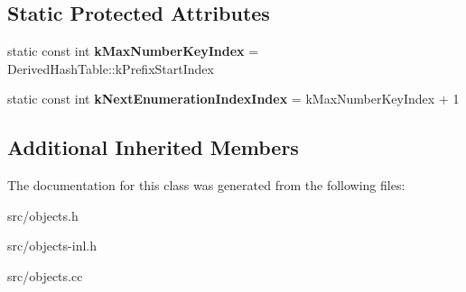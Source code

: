 \subsection*{Static Protected Attributes}
\begin{DoxyCompactItemize}
\item 
\hypertarget{classv8_1_1internal_1_1_dictionary_a7a69bd868bc49dfac48d810d96477fd0}{}static const int {\bfseries k\+Max\+Number\+Key\+Index} = Derived\+Hash\+Table\+::k\+Prefix\+Start\+Index\label{classv8_1_1internal_1_1_dictionary_a7a69bd868bc49dfac48d810d96477fd0}

\item 
\hypertarget{classv8_1_1internal_1_1_dictionary_a533fe267328e05aaa345589cc5ae69eb}{}static const int {\bfseries k\+Next\+Enumeration\+Index\+Index} = k\+Max\+Number\+Key\+Index + 1\label{classv8_1_1internal_1_1_dictionary_a533fe267328e05aaa345589cc5ae69eb}

\end{DoxyCompactItemize}
\subsection*{Additional Inherited Members}


The documentation for this class was generated from the following files\+:\begin{DoxyCompactItemize}
\item 
src/objects.\+h\item 
src/objects-\/inl.\+h\item 
src/objects.\+cc\end{DoxyCompactItemize}
